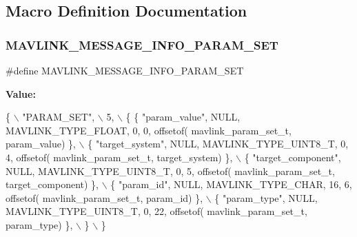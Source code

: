 \subsection{Macro Definition Documentation}
\mbox{\label{mavlink__msg__param__set_8h_af18756a126fd6826c08fe2f22b6d105d}} 
\subsubsection{M\+A\+V\+L\+I\+N\+K\+\_\+\+M\+E\+S\+S\+A\+G\+E\+\_\+\+I\+N\+F\+O\+\_\+\+P\+A\+R\+A\+M\+\_\+\+S\+ET}
{\footnotesize\ttfamily \#define M\+A\+V\+L\+I\+N\+K\+\_\+\+M\+E\+S\+S\+A\+G\+E\+\_\+\+I\+N\+F\+O\+\_\+\+P\+A\+R\+A\+M\+\_\+\+S\+ET}

{\bfseries Value\+:}
\begin{DoxyCode}
\{ \(\backslash\)
    \textcolor{stringliteral}{"PARAM\_SET"}, \(\backslash\)
    5, \(\backslash\)
    \{  \{ \textcolor{stringliteral}{"param\_value"}, NULL, MAVLINK_TYPE_FLOAT, 0, 0, offsetof(
      mavlink_param_set_t, param\_value) \}, \(\backslash\)
         \{ \textcolor{stringliteral}{"target\_system"}, NULL, MAVLINK_TYPE_UINT8_T, 0, 4, offsetof(
      mavlink_param_set_t, target\_system) \}, \(\backslash\)
         \{ \textcolor{stringliteral}{"target\_component"}, NULL, MAVLINK_TYPE_UINT8_T, 0, 5, offsetof(
      mavlink_param_set_t, target\_component) \}, \(\backslash\)
         \{ \textcolor{stringliteral}{"param\_id"}, NULL, MAVLINK_TYPE_CHAR, 16, 6, offsetof(
      mavlink_param_set_t, param\_id) \}, \(\backslash\)
         \{ \textcolor{stringliteral}{"param\_type"}, NULL, MAVLINK_TYPE_UINT8_T, 0, 22, offsetof(
      mavlink_param_set_t, param\_type) \}, \(\backslash\)
         \} \(\backslash\)
\}
\end{DoxyCode}
\mbox{\label{mavlink__msg__param__set_8h_a8b4eba19029845bc92ea9922e2d4e6d4}} 
